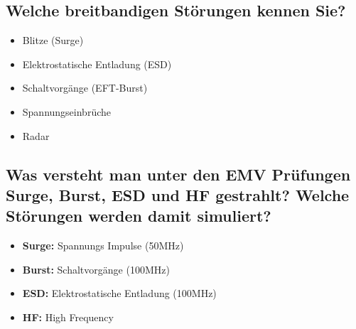 \subsection{Welche breitbandigen Störungen kennen Sie?}
\begin{itemize}
  \item Blitze (Surge)
  \item Elektrostatische Entladung (ESD)
  \item Schaltvorgänge (EFT-Burst)
  \item Spannungseinbrüche
  \item Radar
\end{itemize}

\subsection{Was versteht man unter den EMV Prüfungen Surge, Burst, ESD und HF gestrahlt? Welche Störungen werden damit simuliert?}
\begin{itemize}
  \item \textbf{Surge:} Spannungs Impulse (50MHz)
  \item \textbf{Burst:} Schaltvorgänge (100MHz)
  \item \textbf{ESD:} Elektrostatische Entladung (100MHz)
  \item \textbf{HF:} High Frequency
\end{itemize}
